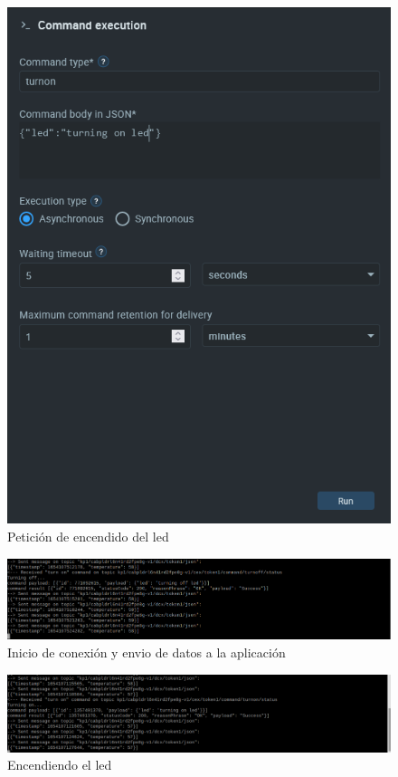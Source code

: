 {\begin{figure}[p]
    \centering
    \includegraphics[width=\linewidth]{imagenes/turn-on-led.png}
    \caption{Petición de encendido del led}
    \label{fig:figure15}
\end{figure}

\begin{figure}[p]
    \centering
    \includegraphics[width=\linewidth]{imagenes/2022-06-01-201846_1920x1080_scrot.png}
    \caption{Inicio de conexión y envio de datos a la aplicación}
    \label{fig:figure16}
\end{figure}

\begin{figure}[p]
    \centering
    \includegraphics[width=\linewidth]{imagenes/2022-06-01-201209_1920x1080_scrot.png}
    \caption{Encendiendo el led}
    \label{fig:figure17}
\end{figure}

}
